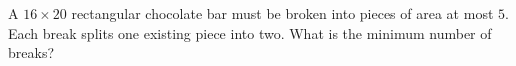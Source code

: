 A $16\times20$ rectangular chocolate bar must be broken into pieces of area at most $5$. Each break splits one existing piece into two. What is the minimum number of breaks?
